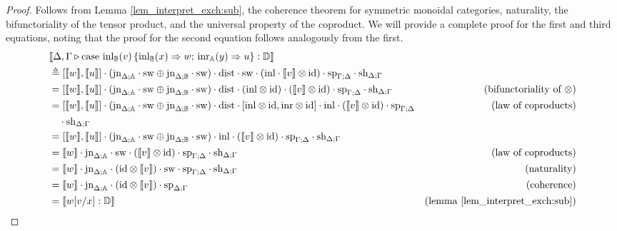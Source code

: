 \documentclass[10pt,a4paper]{amsart}
\theoremstyle{definition}
\theoremstyle{definition}
\theoremstyle{definition}
\theoremstyle{definition}
\theoremstyle{definition}
\theoremstyle{definition}
\begin{document}
\begin{proof}
  Follows from Lemma \autoref{lem_interpret_exch:sub}, the coherence theorem for symmetric monoidal categories, naturality,  the bifunctoriality of the tensor product, and the universal property of the coproduct.   
  We will provide a complete proof for the first and third equations, noting that the proof for the second equation follows analogously from the first.
  \begin{align*}
    &\llbracket \Delta,\Gamma \triangleright  \text{case }  \text{inl}_{\mathbb{B}}(v)\, \{\text{inl}_{\mathbb{B}} (x) \Rightarrow w ;\, \text{inr}_{\mathbb{A}} (y) \Rightarrow u\}: \mathbb{D}\rrbracket \\
    & \triangleq  [\llbracket w\rrbracket,\llbracket u \rrbracket] \cdot (\text{jn}_{\Delta;\mathbb{A}} \cdot \mathrm{sw} \oplus \text{jn}_{\Delta;\mathbb{B}} \cdot \mathrm{sw}  ) \cdot \mathrm{dist} \cdot \mathrm{sw} \cdot (\mathrm{inl} \cdot \llbracket  v \rrbracket \otimes \text{id}) \cdot \text{sp}_{\Gamma;\Delta} \cdot \text{sh}_{\Delta;\Gamma} \\
    & =  [\llbracket w\rrbracket,\llbracket u \rrbracket] \cdot (\text{jn}_{\Delta;\mathbb{A}} \cdot \mathrm{sw} \oplus \text{jn}_{\Delta;\mathbb{B}} \cdot \mathrm{sw} ) \cdot \mathrm{dist} \cdot (\mathrm{inl} \otimes \text{id}  ) \cdot ( \llbracket  v \rrbracket \otimes \text{id}) \cdot \text{sp}_{\Gamma;\Delta} \cdot \text{sh}_{\Delta;\Gamma} &{(\text{bifunctoriality  of } \otimes}) \\
    & =  [\llbracket w\rrbracket,\llbracket u \rrbracket] \cdot (\text{jn}_{\Delta;\mathbb{A}} \cdot \mathrm{sw} \oplus \text{jn}_{\Delta;\mathbb{B}} \cdot \mathrm{sw} ) \cdot \mathrm{dist} \cdot [\mathrm{inl} \otimes \mathrm{id}, \mathrm{inr} \otimes \mathrm{id}] \cdot \mathrm{inl}  \cdot ( \llbracket  v \rrbracket \otimes \text{id}) \cdot \text{sp}_{\Gamma;\Delta}  &(\text{law of coproducts})\\
    & \hspace{10pt} \cdot \text{sh}_{\Delta;\Gamma}  \\
    & =  [\llbracket w\rrbracket,\llbracket u \rrbracket] \cdot (\text{jn}_{\Delta;\mathbb{A}} \cdot \mathrm{sw} \oplus \text{jn}_{\Delta;\mathbb{B}} \cdot \mathrm{sw} )  \cdot \mathrm{inl}  \cdot ( \llbracket  v \rrbracket \otimes \text{id}) \cdot \text{sp}_{\Gamma;\Delta} \cdot \text{sh}_{\Delta;\Gamma}  \\
    & = \llbracket  w \rrbracket\cdot \text{jn}_{\Delta;\mathbb{A}} \cdot   \mathrm{sw} \cdot(\llbracket v \rrbracket \otimes  \text{id}) \cdot \text{sp}_{\Gamma;\Delta} \cdot \text{sh}_{\Delta; \Gamma}  & {\text{(law of coproducts)}} \\
    &=  \llbracket  w \rrbracket\cdot \text{jn}_{\Delta;\mathbb{A}}  \cdot(  \text{id}\otimes \llbracket v \rrbracket ) \cdot   \mathrm{sw} \cdot \text{sp}_{\Gamma;\Delta} \cdot \text{sh}_{\Delta; \Gamma} & {\text{(naturality)}} \\
    &= \llbracket w \rrbracket \cdot \text{jn}_{\Delta;\mathbb{A}} \cdot( \text{id} \otimes \llbracket v \rrbracket) \cdot \text{sp}_{\Delta;\Gamma}& {\text{(coherence)}}\\
    & = \llbracket w[v/x] : \mathbb{D} \rrbracket  & {\text{(lemma \ref{lem_interpret_exch:sub})}}
\end{align*}


\end{proof}
\end{document}
